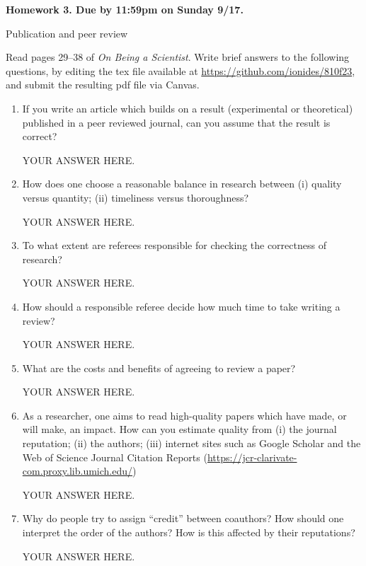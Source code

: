 \documentclass[12pt]{article}
\begin{document}
\begin{center}\bf
Homework 3. Due by 11:59pm on Sunday 9/17.

Publication and peer review

\end{center}

Read pages 29--38 of {\em On Being a Scientist}. Write brief answers to the following questions, by editing the tex file available at \url{https://github.com/ionides/810f23}, and submit the resulting pdf file via Canvas. 

\begin{enumerate}
\item If you write an article which builds on a result (experimental or theoretical) published in a peer reviewed journal, can you assume that the result is correct?

YOUR ANSWER HERE.

\item How does one choose a reasonable balance in research between (i) quality versus quantity; (ii) timeliness versus thoroughness?

YOUR ANSWER HERE.

\item To what extent are referees responsible for checking the correctness of research? 

YOUR ANSWER HERE.

\item How should a responsible referee decide how much time to take writing a review? 

YOUR ANSWER HERE.

\item What are the costs and benefits of agreeing to review a paper?

YOUR ANSWER HERE.

\item As a researcher, one aims to read high-quality papers which have made, or will make, an impact. How can you estimate quality from (i) the journal reputation; (ii) the authors; (iii) internet sites such as Google Scholar and the Web of Science Journal Citation Reports (\url{https://jcr-clarivate-com.proxy.lib.umich.edu/})  

YOUR ANSWER HERE.

\item Why do people try to assign ``credit'' between coauthors? How should one interpret the order of the authors? How is this affected by their reputations? 

YOUR ANSWER HERE.


\end{enumerate}
\end{document}
